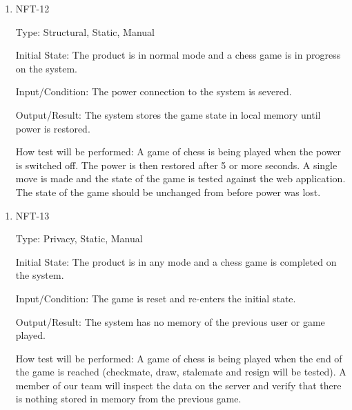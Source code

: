 \documentclass[12pt, titlepage]{article}
\begin{document}
\begin{enumerate}
    \item{NFT-12}

        Type: Structural, Static, Manual
                            
        Initial State: The product is in normal mode and a chess game is in progress on the system.
                            
        Input/Condition: The power connection to the system is severed.
                            
        Output/Result: The system stores the game state in local memory until power is restored.
                            
        How test will be performed: A game of chess is being played when the power is switched off. The power is then restored after 5 or more seconds. A single
            move is made and the state of the game is tested against the web application. The state of the game should be unchanged from before power was lost.
\end{enumerate}

\begin{enumerate}
    \item{NFT-13}

        Type: Privacy, Static, Manual
                            
        Initial State: The product is in any mode and a chess game is completed on the system.
                            
        Input/Condition: The game is reset and re-enters the initial state.
                            
        Output/Result: The system has no memory of the previous user or game played.
                            
        How test will be performed: A game of chess is being played when the end of the game is reached (checkmate, draw, stalemate and resign will be tested).
            A member of our team will inspect the data on the server and verify that there is nothing stored in memory from the previous game.
\end{enumerate}
\end{document}

